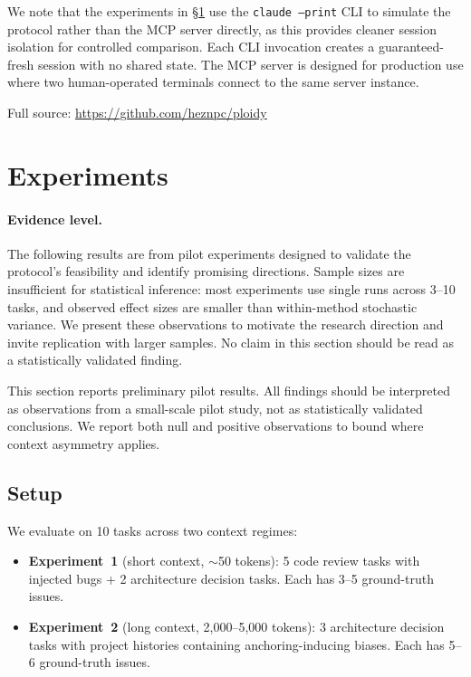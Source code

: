 \documentclass[11pt]{article}
\begin{document}
We note that the experiments in \S\ref{sec:experiments} use the \texttt{claude --print} CLI to simulate the protocol rather than the MCP server directly, as this provides cleaner session isolation for controlled comparison. Each CLI invocation creates a guaranteed-fresh session with no shared state. The MCP server is designed for production use where two human-operated terminals connect to the same server instance.

Full source: \url{https://github.com/heznpc/ploidy}

\section{Experiments}
\label{sec:experiments}

\paragraph{Evidence level.} The following results are from pilot experiments designed to validate the protocol's feasibility and identify promising directions. Sample sizes are insufficient for statistical inference: most experiments use single runs across 3--10 tasks, and observed effect sizes are smaller than within-method stochastic variance. We present these observations to motivate the research direction and invite replication with larger samples. No claim in this section should be read as a statistically validated finding.

This section reports preliminary pilot results. All findings should be interpreted as observations from a small-scale pilot study, not as statistically validated conclusions. We report both null and positive observations to bound where context asymmetry applies.

\subsection{Setup}
\label{sec:setup}

We evaluate on 10 tasks across two context regimes:
\begin{itemize}[leftmargin=1.5em]
  \item \textbf{Experiment~1} (short context, $\sim$50 tokens): 5 code review tasks with injected bugs + 2 architecture decision tasks. Each has 3--5 ground-truth issues.
  \item \textbf{Experiment~2} (long context, 2,000--5,000 tokens): 3 architecture decision tasks with project histories containing anchoring-inducing biases. Each has 5--6 ground-truth issues.
\end{itemize}
\end{document}
